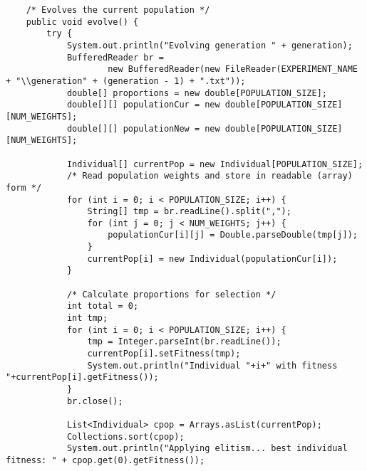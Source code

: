\documentclass[12pt,a4paper]{article}
\begin{document}
\begin{lstlisting}
    /* Evolves the current population */
    public void evolve() {
        try {
            System.out.println("Evolving generation " + generation);
            BufferedReader br =
                    new BufferedReader(new FileReader(EXPERIMENT_NAME + "\\generation" + (generation - 1) + ".txt"));
            double[] proportions = new double[POPULATION_SIZE];
            double[][] populationCur = new double[POPULATION_SIZE][NUM_WEIGHTS];
            double[][] populationNew = new double[POPULATION_SIZE][NUM_WEIGHTS];

            Individual[] currentPop = new Individual[POPULATION_SIZE];
            /* Read population weights and store in readable (array) form */
            for (int i = 0; i < POPULATION_SIZE; i++) {
                String[] tmp = br.readLine().split(",");
                for (int j = 0; j < NUM_WEIGHTS; j++) {
                    populationCur[i][j] = Double.parseDouble(tmp[j]);
                }
                currentPop[i] = new Individual(populationCur[i]);
            }

            /* Calculate proportions for selection */
            int total = 0;
            int tmp;
            for (int i = 0; i < POPULATION_SIZE; i++) {
                tmp = Integer.parseInt(br.readLine());
                currentPop[i].setFitness(tmp);
                System.out.println("Individual "+i+" with fitness "+currentPop[i].getFitness());
            }
            br.close();

            List<Individual> cpop = Arrays.asList(currentPop);
            Collections.sort(cpop);
            System.out.println("Applying elitism... best individual fitness: " + cpop.get(0).getFitness());


\end{lstlisting}
\end{document}
